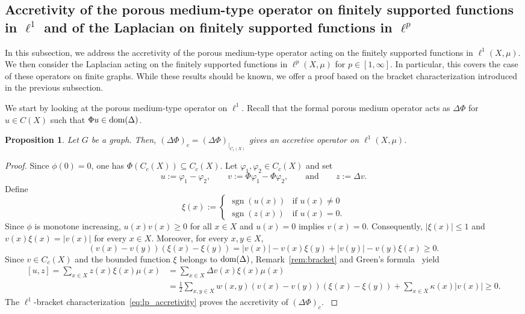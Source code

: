 \documentclass[letterpaper]{article}
\newtheorem{proposition}[lemma]{Proposition}
\theoremstyle{definition}
\theoremstyle{named}
\numberwithin{equation}{section}
\newcommand{\sgn}{\operatorname{sgn}}
\newcommand{\dom}{\textnormal{dom}} %
\begin{document}
\subsection{\texorpdfstring{Accretivity of the porous medium-type operator on finitely supported functions in $\ell^1$
and of the Laplacian on finitely supported functions in $\ell^p$}{Accretivity of the porous medium-type operator on finitely supported functions in ell1 and of the Laplacian on finitely supported functions in ellp}}
In this subsection, we address the accretivity of the porous medium-type operator
acting on the finitely supported functions in $\ell^1(X,\mu)$.
We then consider the Laplacian acting on the finitely
supported functions in $\ell^p(X,\mu)$ for $p \in [1,\infty]$. In particular, this covers
the case of these operators on finite graphs. While these results should be known, we offer
a proof based on the bracket characterization introduced in the previous subsection. 



We start by looking at the porous medium-type operator on $\ell^1$.
Recall that the formal porous medium operator acts as $\Delta \Phi $
for $u \in C(X)$ such that $\Phi u \in \dom(\Delta)$. 

\begin{proposition}\label{p:PMTO_accretivity_Cc}
    Let $G$ be a graph. Then, $(\Delta \Phi)_c = (\Delta \Phi)_{\vert_{C_c(X)}}$
    gives an accretive operator on $\ell^1(X,\mu)$. 
\end{proposition}
\begin{proof}
{
Since $\phi(0)=0$, one has $\Phi(C_c(X))\subseteq C_c(X)$. Let $\varphi_1,\varphi_2\in C_c(X)$ and set
\[
 u:=\varphi_1-\varphi_2,\qquad
 v:=\Phi\varphi_1-\Phi\varphi_2,\qquad \text{and} \qquad
 z:=\Delta v.
\]
Define
\[
 \xi(x):=
 \begin{cases}
  \sgn(u(x))& \text{if }u(x)\neq0\\
  \sgn(z(x))& \text{if }u(x)=0.
 \end{cases}
\]
Since $\phi$ is monotone increasing,
$u(x)v(x)\geq0$ for all $x \in X$ and $u(x)=0$ implies $v(x)=0$. Consequently,
$|\xi(x)|\leq1$ and $v(x)\xi(x)=|v(x)|$ for every $x\in X$.
Moreover, for every $x,y\in X$,
\[
 (v(x)-v(y))(\xi(x)-\xi(y))
 =|v(x)| -v(x)\xi(y)+|v(y)|-v(y)\xi(x)\geq0.
\]
Since $v\in C_c(X)$ and the bounded function $\xi$ belongs to $\dom(\Delta)$,
Remark~\ref{rem:bracket} and Green's formula~\cite[Proposition~1.5]{keller2021graphs} yield
\[
\begin{aligned}
[u,z]= \sum_{x\in X}z(x)\xi(x)\mu(x) &= \sum_{x\in X}\Delta v(x)\xi(x)\mu(x)\\
&=\frac12\sum_{x,y\in X}w(x,y)(v(x)-v(y))(\xi(x)-\xi(y))
+\sum_{x\in X}\kappa(x)|v(x)|\geq0.
\end{aligned}
\]
The $\ell^1$-bracket characterization~\eqref{eq:lp_accretivity} proves the accretivity of $(\Delta\Phi)_c$.
}
\end{proof}
\end{document}
